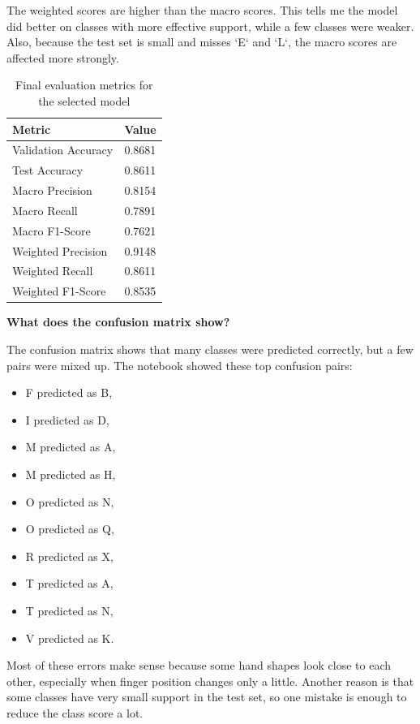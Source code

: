\documentclass[12pt,a4paper]{article}
\newcommand{\qtext}[1]{\noindent\textbf{#1}\par}
\newcommand{\ansstart}{\begingroup\color{answerblue}}
\newcommand{\ansend}{\endgroup}
\begin{document}
The weighted scores are higher than the macro scores. This tells me the model did better on classes with more effective support, while a few classes were weaker. Also, because the test set is small and misses `E` and `L`, the macro scores are affected more strongly.
\ansend

\begin{table}[H]
\centering
\caption{Final evaluation metrics for the selected model}
\begin{tabular}{lc}
\toprule
Metric & Value \\
\midrule
Validation Accuracy & 0.8681 \\
Test Accuracy & 0.8611 \\
Macro Precision & 0.8154 \\
Macro Recall & 0.7891 \\
Macro F1-Score & 0.7621 \\
Weighted Precision & 0.9148 \\
Weighted Recall & 0.8611 \\
Weighted F1-Score & 0.8535 \\
\bottomrule
\end{tabular}
\end{table}

\qtext{What does the confusion matrix show?}

\ansstart
The confusion matrix shows that many classes were predicted correctly, but a few pairs were mixed up. The notebook showed these top confusion pairs:
\begin{itemize}[leftmargin=1.2cm]
    \item F predicted as B,
    \item I predicted as D,
    \item M predicted as A,
    \item M predicted as H,
    \item O predicted as N,
    \item O predicted as Q,
    \item R predicted as X,
    \item T predicted as A,
    \item T predicted as N,
    \item V predicted as K.
\end{itemize}

Most of these errors make sense because some hand shapes look close to each other, especially when finger position changes only a little. Another reason is that some classes have very small support in the test set, so one mistake is enough to reduce the class score a lot.
\ansend
\end{document}
